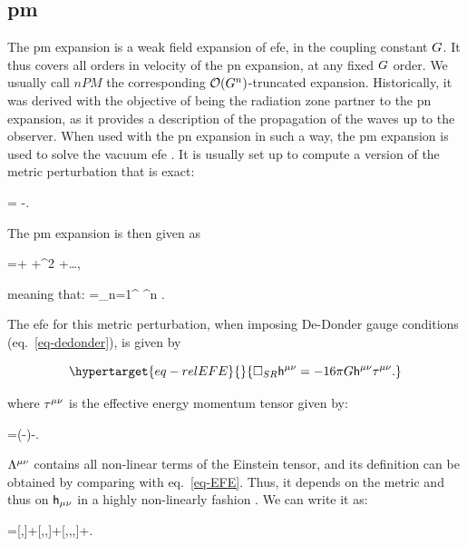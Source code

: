 \documentclass[
  11pt,
  a4paper,
  DIV=11,
  numbers=noendperiod,
  twoside]{scrreprt}
\let\[\relax \let\]\relax %
\DeclareRobustCommand{\[}{\begin{equation}}
\DeclareRobustCommand{\]}{\end{equation}}
\begin{document}
\hypertarget{pm}{%
\subsection{\texorpdfstring{\acrlong{pm}}{}}\label{pm}}

The \acrfull{pm} expansion is a weak field expansion of \gls{efe}, in
the coupling constant \(\grav\). It thus covers all orders in velocity
of the \gls{pn} expansion, at any fixed \(\grav\) order. We usually call
\(nPM\) the corresponding \(\order[n]{\grav}\)-truncated expansion.
Historically, it was derived with the objective of being the radiation
zone partner to the \gls{pn} expansion, as it provides a description of
the propagation of the waves up to the observer. When used with the
\gls{pn} expansion in such a way, the \gls{pm} expansion is used to
solve the vacuum \gls{efe} . It is usually set up to compute a version
of the metric perturbation that is exact:

\[\pertmet=\sqrt{-\metricTensor} \invmet-\invmink.\]

The \gls{pm} expansion is then given as

\[
\sqrt{-\metricTensor} \invmet=\invmink+ \grav {}+\grav^2 +\ldots,
\]

meaning that: \[
\invpertmet=\sum\limits_{n=1}^{\infty} \grav^n  .
\]

The \gls{efe} for this metric perturbation, when imposing De-Donder
gauge conditions (eq.~\ref{eq-dedonder}), is given by

\begin{equation}\protect\hypertarget{eq-relEFE}{}{
\SRDA \invpertmet=-16 \pi \grav \invpertmet \relSEct .
}\label{eq-relEFE}\end{equation}

where \(\relSEct\) is the effective energy momentum tensor given by:

\[
\relSEct=(-\metricTensor)\SEct -\inv{16 \pi \grav}\ct[\mu\nu]{\Lambda}.
\]

\(\ct[\mu\nu]{\Lambda}\) contains all non-linear terms of the Einstein
tensor, and its definition can be obtained by comparing with
eq.~\ref{eq-EFE}. Thus, it depends on the metric and thus on
\(\pertmet\) in a highly non-linearly fashion . We can write it as:

\[
\ct[\mu\nu]{\Lambda}=[\pertTensor,\pertTensor]+[\pertTensor,\pertTensor,\pertTensor]+[\pertTensor,\pertTensor,\pertTensor,\pertTensor]+\order[5]{\pertTensor}.
\]
\end{document}
